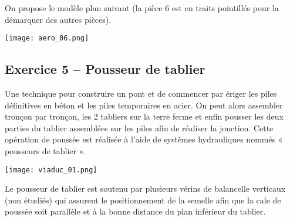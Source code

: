 On propose le modèle plan suivant (la pièce 6 est en traits pointillés pour la démarquer des autres pièces).


\begin{center}
\texttt{[image: aero\_06.png]}
\end{center}

%
%
%
%


\subsection*{Exercice 5 -- Pousseur de tablier}




Une technique pour construire un pont et de commencer par ériger les piles définitives en béton et les piles
temporaires en acier. On peut alors assembler tronçon par tronçon, les 2 tabliers sur la terre ferme et enfin
pousser les deux parties du tablier assemblées sur les piles afin de réaliser la jonction.
Cette opération de poussée est réalisée à l’aide de systèmes hydrauliques nommés « pousseurs
de tablier ». 
\begin{marginfigure}
\centering
\texttt{[image: viaduc\_01.png]}
\end{marginfigure}

Le pousseur de tablier est soutenu par plusieurs vérins de balancelle verticaux (non étudiés) qui assurent le positionnement de la semelle afin que la cale de poussée soit parallèle et à la bonne distance du plan inférieur du tablier. 

